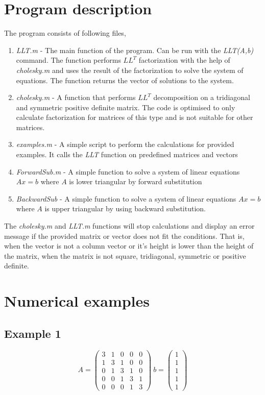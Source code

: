\documentclass[12pt]{article}
\begin{document}
\section{Program description}
The program consists of following files,
\begin{enumerate}
\item \textit{LLT.m} - The main function of the program. Can be run with the \textit{LLT(A,b)} command. The function performs $LL^T$ factorization with the help of \textit{cholesky.m} and uses the result of the factorization to solve the system of equations. The function returns the vector of solutions to the system.
\item \textit{cholesky.m} - A function that performs $LL^T$ decomposition on a tridiagonal and symmetric positive definite matrix. The code is optimised to only calculate factorization for matrices of this type and is not suitable for other matrices.
\item \textit{examples.m} - A simple script to perform the calculations for provided examples. It calls the \textit{LLT} function on predefined matrices and vectors
\item \textit{ForwardSub.m} - A simple function to solve a system of linear equations $Ax=b$  where $A$ is lower triangular by forward substitution
\item \textit{BackwardSub} - A simple function to solve a system of linear equations $Ax=b$
where $A$ is upper triangular by using backward substitution.
\end{enumerate}
The \textit{cholesky.m} and \textit{LLT.m} functions will stop calculations and display an error message if the provided matrix or vector does not fit the conditions. That is, when the vector is not a column vector or it's height is lower than the height of the matrix, when the matrix is not square, tridiagonal, symmetric or positive definite.

\section{Numerical examples}
\subsection{Example 1}
$$A = \left(\begin{array}{ccccc} 3 & 1 & 0 & 0 & 0\\ 1 & 3 & 1 & 0 & 0\\ 0 & 1 & 3 & 1 & 0\\ 0 & 0 & 1 & 3 & 1\\ 0 & 0 & 0 & 1 & 3 \end{array}\right)\ 
b = \left(\begin{array}{c} 1\\ 1\\ 1\\ 1\\ 1 \end{array}\right)$$
\end{document}
